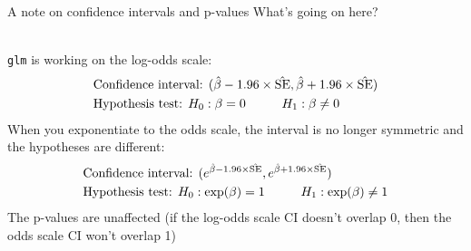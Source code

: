 \documentclass[10pt,t]{beamer}
\newcommand\tab[1][1cm]{\hspace*{#1}}
\begin{document}
\begin{frame}{A note on confidence intervals and p-values}
	What's going on here? 
	\\ ~\
	
	\texttt{glm} is working on the log-odds scale:
	\begin{align*}
		&\text{Confidence interval: }(\hat{\beta} - 1.96 \times \hat{\text{SE}}, \hat{\beta} + 1.96 \times \hat{\text{SE}})\\
		&\text{Hypothesis test: }H_0: \beta = 0 \tab H_1: \beta \neq 0
	\end{align*}
	When you exponentiate to the odds scale, the interval is no longer symmetric and the hypotheses are different:
	\begin{align*}
		&\text{Confidence interval: }(e^{\hat{\beta} - 1.96 \times \hat{\text{SE}}}, e^{\hat{\beta} + 1.96 \times \hat{\text{SE}}})\\
		&\text{Hypothesis test: }H_0: \exp(\beta) = 1 \tab H_1: \exp(\beta) \neq 1
	\end{align*} 
	The p-values are unaffected (if the log-odds scale CI doesn't overlap 0, then the odds scale CI won't overlap 1)
\end{frame}
%
%	
%	
\end{document}
